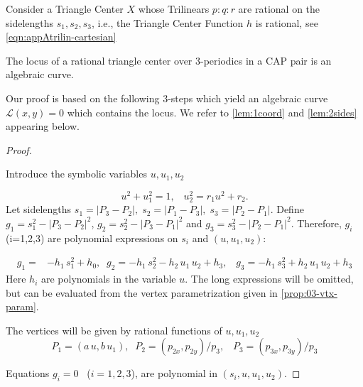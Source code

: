 


Consider a Triangle Center $X$ whose Trilinears $p:q:r$ are rational on the sidelengths $s_1,s_2,s_3$, i.e., the Triangle Center Function $h$ is rational, see  
\cref{eqn:appAtrilin-cartesian}

\begin{theorem}
The locus of a rational triangle center
over 3-periodics in a CAP pair is an algebraic curve.
\label{thm:04-rational-center}
\end{theorem}

Our proof is based on the following 3-steps which yield an algebraic curve $\mathcal{L}(x,y)=0$ which contains the locus. We refer to \cref{lem:1coord} and \cref{lem:2sides} appearing below. %

\begin{proof}

		
\begin{step}

 
Introduce the symbolic variables $u, u_1, u_2$
 
\begin{equation*}
    u^2 + u_1^2 = 1,\;\;\;   u_2^2 = r_1u^2+r_2.
\end{equation*} %
Let sidelengths $s_1=|P_3-P_2|,\; s_2=|P_1-P_3|,\;s_3=|P_2-P_1|$. Define $g_1=s_1^2-|P_3-P_2|^2$, $g_2=s_2^2-|P_3-P_1|^2$
and $g_3=s_3^2-|P_2-P_1|^2$. 
Therefore, $g_i$(i=1,2,3)   are polynomial expressions on $s_i$ and $(u,u_1,u_2)$:


	\begin{align*}
		g_1=&    -h_1 \, s_1^2 
		+h_0,\;\;g_2=- h_1\, s_2^2 -
		h_2 \,u_1 \,u_2 +h_3,\;\;\;g_3=- h_1 \,s_3^2 + h_2\,  u_1\, u_2+h_3\end{align*}
Here $h_i$ are polynomials in the variable $u$.	The long expressions will be 
omitted, but can be evaluated from the vertex parametrization given in \cref{prop:03-vtx-param}.	
\end{step}
 
\noindent The vertices will be given by rational functions of   $u, u_1, u_2$ 
\begin{equation*} P_1 = (a\,u, b\,u_1),\;\;P_2 = (p_{2x}, p_{2y})/p_3,\;\;\;P_3 = (p_{3x}, p_{3y})/p_3 
\end{equation*}
 
Equations $g_i=0$ \, ($i=1,2,3$), are polynomial in $ (s_i,u,u_1,u_2)$.
 

\end{proof}
